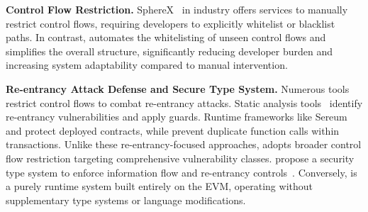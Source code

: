 \noindent
\textbf{Control Flow Restriction.}
SphereX~\cite{spherex} in industry offers services to manually restrict control flows, 
requiring developers to explicitly whitelist or 
blacklist paths. 
In contrast, {\name} automates the whitelisting of unseen control 
flows and simplifies the overall structure, 
significantly reducing developer burden and increasing 
system adaptability compared to manual intervention.




\noindent
\textbf{Re-entrancy Attack Defense and Secure Type System.}
Numerous tools restrict control flows to combat re-entrancy attacks. 
Static analysis tools~\cite{luu2016making,torres2018osiris,liu2018reguard,feist2019slither,
zhang2019mpro,bose2022sailfish,ma2021pluto,zheng2022park,wang2024efficiently,
albert2020taming} identify re-entrancy vulnerabilities and apply guards. 
Runtime frameworks like Sereum~\cite{rodler2018sereum} and 
\citeauthor{grossman2017online} protect deployed contracts, 
while \citeauthor{callens2024temporarily} prevent duplicate 
function calls within transactions. Unlike these 
re-entrancy-focused approaches, {\name} adopts broader 
control flow restriction targeting comprehensive vulnerability classes.
\citeauthor{cecchetti2020securing} propose a security type system to 
enforce information flow and re-entrancy controls~\cite{cecchetti2020securing,
cecchetti2021compositional}. Conversely, 
{\name} is a purely runtime system built entirely on the EVM, 
operating without supplementary type systems or language modifications.








